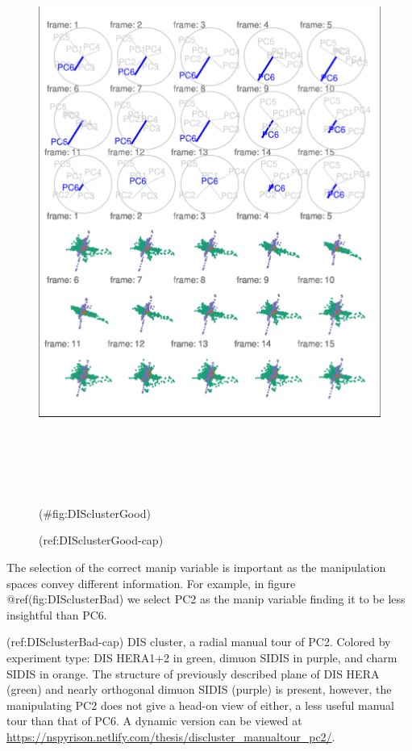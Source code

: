 \begin{Schunk}
\begin{figure}

{\centering \includegraphics[width=6in,height=7.2in]{spinifex_paper_files/figure-latex/DISclusterGood-1} 

}

\caption[(ref:DISclusterGood-cap)]{(ref:DISclusterGood-cap)}(\#fig:DISclusterGood)
\end{figure}
\end{Schunk}

The selection of the correct manip variable is important as the manipulation spaces convey different information. For example, in figure @ref(fig:DISclusterBad) we select PC2 as the manip variable finding it to be less insightful than PC6.

(ref:DISclusterBad-cap) DIS cluster, a radial manual tour of PC2. Colored by experiment type: DIS HERA1+2 in green, dimuon SIDIS in purple, and charm SIDIS in orange. The structure of previously described plane of DIS HERA (green) and nearly orthogonal dimuon SIDIS (purple) is present, however, the manipulating PC2 does not give a head-on view of either, a less useful manual tour than that of PC6. A dynamic version can be viewed at \url{https://nspyrison.netlify.com/thesis/discluster_manualtour_pc2/}.

